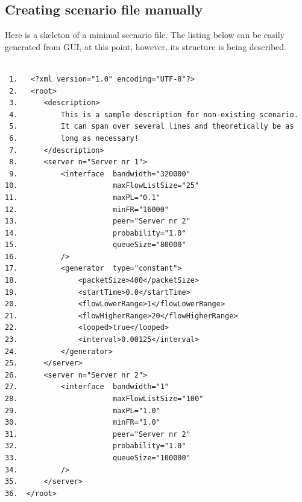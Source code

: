 \documentclass[a4paper,12pt]{article}
\begin{document}
   \subsection{Creating scenario file manually}
	\label{MANUALCREATION}
    Here is a skeleton of a minimal scenario file. The listing below can be
    easily generated from GUI, at this point, however, its structure is 
   being described.
    \begin{verbatim}

 1.   <?xml version="1.0" encoding="UTF-8"?>
 2.   <root>
 3.      <description>
 4.          This is a sample description for non-existing scenario.
 5.          It can span over several lines and theoretically be as
 6.          long as necessary!
 7.      </description>
 8.      <server n="Server nr 1">
 9.          <interface	 bandwidth="320000"
10.                      maxFlowListSize="25"
11.                      maxPL="0.1"
12.                      minFR="16000"
13.                      peer="Server nr 2"
14.                      probability="1.0"
15.                      queueSize="80000"
16.          />
17.          <generator  type="constant">
18.              <packetSize>400</packetSize>
19.              <startTime>0.0</startTime>
20.              <flowLowerRange>1</flowLowerRange>
21.              <flowHigherRange>20</flowHigherRange>
22.              <looped>true</looped>
23.              <interval>0.00125</interval>
24.          </generator>
25.      </server>
26.      <server n="Server nr 2">
27.          <interface  bandwidth="1" 
28.                      maxFlowListSize="100"
29.                      maxPL="1.0"
30.                      minFR="1.0"
31.                      peer="Server nr 2"
32.                      probability="1.0"
33.                      queueSize="100000"
34.          />
35.      </server>
36.  </root> 

	\end{verbatim}
\end{document}
